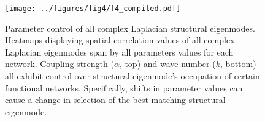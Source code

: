 \documentclass{article}
\begin{document}
\begin{figure}[ht]
\centering
\texttt{[image: ../figures/fig4/f4\_compiled.pdf]}
\caption{Parameter control of all complex Laplacian structural eigenmodes. Heatmaps displaying spatial correlation values of all complex Laplacian eigenmodes span by all parameters values for each network. Coupling strength ($\alpha$, top) and wave number ($k$, bottom) all exhibit control over structural eigenmode's occupation of certain functional networks. Specifically, shifts in parameter values can cause a change in selection of the best matching structural eigenmode.}
\label{fig:fig4}
\end{figure}


\end{document}
